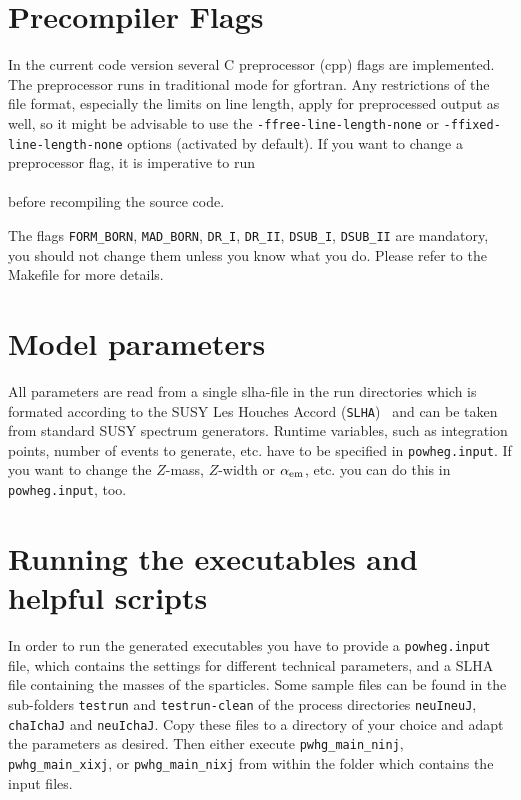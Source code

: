 \documentclass[a4paper,11pt]{article}
\begin{document}
\section*{Precompiler Flags}
In the current code version several C preprocessor (cpp) flags are implemented. The preprocessor runs in traditional mode for gfortran. Any restrictions of the file format, especially the limits on line length, apply for preprocessed output as well, so it might be advisable to use the {\tt -ffree-line-length-none} or {\tt -ffixed-line-length-none} options (activated by default). If you want to change a preprocessor flag, it is imperative to run 
\\[2ex]
\hspace*{2cm}{\tt \$ make clean}
\\[2ex]
before recompiling the source code.

The flags {\tt FORM\_BORN}, {\tt MAD\_BORN}, {\tt DR\_I}, {\tt DR\_II}, {\tt DSUB\_I}, {\tt DSUB\_II} are mandatory, you should not change them unless you know what you do. Please refer to the Makefile for more details.

\section*{Model parameters}
All parameters are read from a single slha-file in the run directories which is formated according to the SUSY Les Houches Accord ({\tt SLHA})~\cite{Skands:2003cj,Allanach:2008qq} and can be taken from standard SUSY spectrum generators. Runtime variables, such as integration points, number of events to generate, etc. have to be specified in {\tt powheg.input}. If you want to change the $Z$-mass, $Z$-width or $\alpha_{\rm em}$, etc. you can do this in {\tt powheg.input}, too.

\section*{Running the executables and helpful scripts}
In order to run the generated executables you have to provide a {\tt powheg.input} file, which contains the settings for different technical parameters, and a SLHA file containing the masses of the sparticles. Some sample files can be found in the sub-folders {\tt testrun} and {\tt testrun-clean} of the process directories {\tt neuIneuJ}, {\tt chaIchaJ} and {\tt neuIchaJ}. Copy these files to a directory of your choice and adapt the parameters as desired. Then either execute {\tt pwhg\_main\_ninj}, {\tt pwhg\_main\_xixj}, or {\tt pwhg\_main\_nixj} from within the folder which contains the input files.
\end{document}
